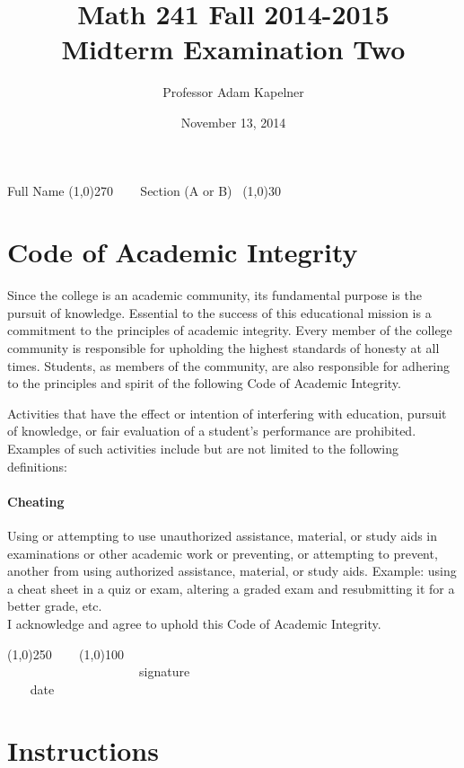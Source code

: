 \documentclass[12pt]{article}
\title{Math 241 Fall 2014-2015 \\ Midterm Examination Two}
\author{Professor Adam Kapelner}
\date{November 13, 2014}
\begin{document}
\maketitle

\noindent Full Name \line(1,0){270} ~~~ Section (A or B)~ \line(1,0){30}

\thispagestyle{empty}

\section*{Code of Academic Integrity}

\footnotesize
Since the college is an academic community, its fundamental purpose is the pursuit of knowledge. Essential to the success of this educational mission is a commitment to the principles of academic integrity. Every member of the college community is responsible for upholding the highest standards of honesty at all times. Students, as members of the community, are also responsible for adhering to the principles and spirit of the following Code of Academic Integrity.

Activities that have the effect or intention of interfering with education, pursuit of knowledge, or fair evaluation of a student's performance are prohibited. Examples of such activities include but are not limited to the following definitions:

\paragraph{Cheating} Using or attempting to use unauthorized assistance, material, or study aids in examinations or other academic work or preventing, or attempting to prevent, another from using authorized assistance, material, or study aids. Example: using a cheat sheet in a quiz or exam, altering a graded exam and resubmitting it for a better grade, etc.
\\

\noindent I acknowledge and agree to uphold this Code of Academic Integrity. \\

\begin{center}
\line(1,0){250} ~~~ \line(1,0){100}\\
~~~~~~~~~~~~~~~~~~~~~signature~~~~~~~~~~~~~~~~~~~~~~~~~~~~~~~~~~~~~~~~~~~~~ date
\end{center}

\normalsize

\section*{Instructions}
\end{document}
